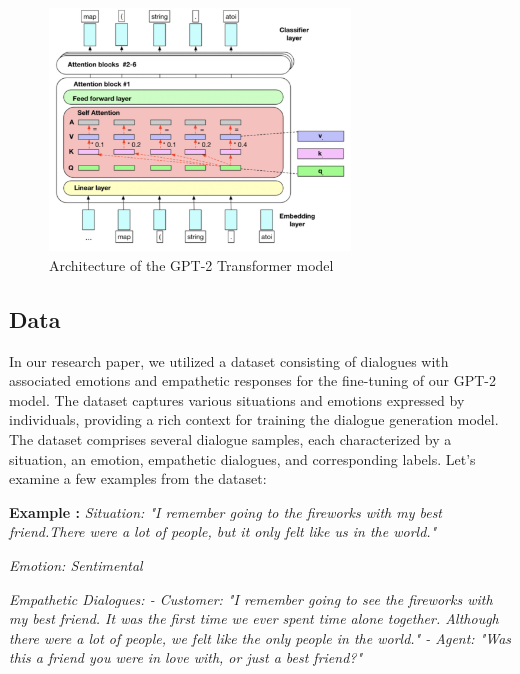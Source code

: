 \documentclass[12pt]{IEEEtran}
\begin{document}
\begin{figure}[htp]
  \centering
  \includegraphics[width=8cm]{2.png}
  \caption{Architecture of the GPT-2 Transformer model}\label{figuregpt-2model}
\end{figure}

\subsection{Data}
In our research paper, we utilized a dataset consisting of dialogues with associated emotions and empathetic responses for the fine-tuning of our GPT-2 model. The dataset captures various situations and emotions expressed by individuals, providing a rich context for training the dialogue generation model. The dataset comprises several dialogue samples, each characterized by a situation, an emotion, empathetic dialogues, and corresponding labels. Let's examine a few examples from the dataset:

\textbf{Example :}
\emph{Situation: "I remember going to the fireworks with my best friend.There were a lot of people, but it only felt like us in the world."}

\emph{Emotion: Sentimental}

\emph{Empathetic Dialogues:
- Customer: "I remember going to see the fireworks with my best friend. It was the first time we ever spent time alone together. Although there were a lot of people, we felt like the only people in the world."
- Agent: "Was this a friend you were in love with, or just a best friend?"}
\end{document}
